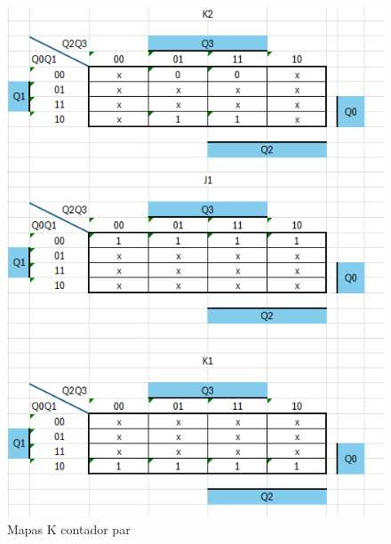 \documentclass{article}
\begin{document}
\begin{figure}[h]
\begin{minipage}{0.45\textwidth}
      \includegraphics[width=\linewidth]{imagenes/mapask_contador_par_2.png} %
      \caption{Mapas K contador par}
      \label{fig:mapaskcontadorpar}
    \end{minipage}
\end{figure}
\newpage
\end{document}
